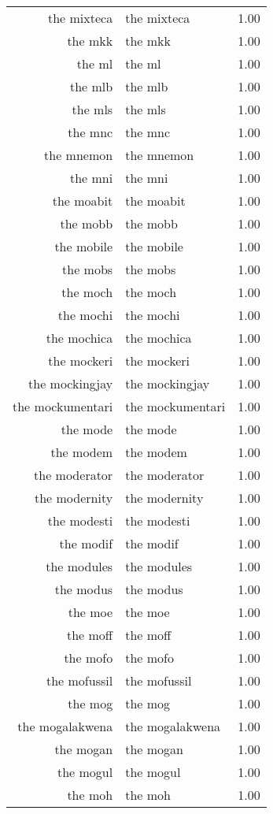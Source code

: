 \begin{table}[ht]
\begin{tabular}{rlr}
  the mixteca & the mixteca & 1.00 \\ 
  the mkk & the mkk & 1.00 \\ 
  the ml & the ml & 1.00 \\ 
  the mlb & the mlb & 1.00 \\ 
  the mls & the mls & 1.00 \\ 
  the mnc & the mnc & 1.00 \\ 
  the mnemon & the mnemon & 1.00 \\ 
  the mni & the mni & 1.00 \\ 
  the moabit & the moabit & 1.00 \\ 
  the mobb & the mobb & 1.00 \\ 
  the mobile & the mobile & 1.00 \\ 
  the mobs & the mobs & 1.00 \\ 
  the moch & the moch & 1.00 \\ 
  the mochi & the mochi & 1.00 \\ 
  the mochica & the mochica & 1.00 \\ 
  the mockeri & the mockeri & 1.00 \\ 
  the mockingjay & the mockingjay & 1.00 \\ 
  the mockumentari & the mockumentari & 1.00 \\ 
  the mode & the mode & 1.00 \\ 
  the modem & the modem & 1.00 \\ 
  the moderator & the moderator & 1.00 \\ 
  the modernity & the modernity & 1.00 \\ 
  the modesti & the modesti & 1.00 \\ 
  the modif & the modif & 1.00 \\ 
  the modules & the modules & 1.00 \\ 
  the modus & the modus & 1.00 \\ 
  the moe & the moe & 1.00 \\ 
  the moff & the moff & 1.00 \\ 
  the mofo & the mofo & 1.00 \\ 
  the mofussil & the mofussil & 1.00 \\ 
  the mog & the mog & 1.00 \\ 
  the mogalakwena & the mogalakwena & 1.00 \\ 
  the mogan & the mogan & 1.00 \\ 
  the mogul & the mogul & 1.00 \\ 
  the moh & the moh & 1.00 \\ 

\end{tabular}
\end{table}
